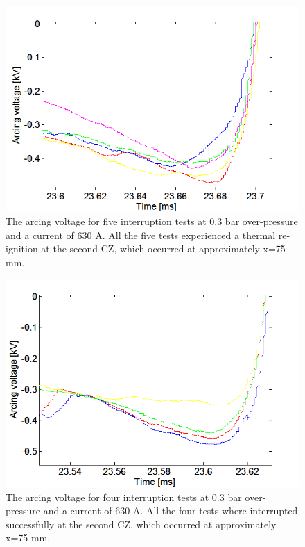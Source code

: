 \documentclass[10pt,b5paper,twoside]{article}
\begin{document}
\begin{figure}[H]
\centering
\includegraphics[scale=0.6, angle =0 ]{Bilder/Results/ArcingVoltage_75_reIgnition.PNG}
\caption{The arcing voltage for five interruption tests at 0.3 bar over-pressure and a current of 630 A. All the five tests experienced a thermal re-ignition at the second CZ, which occurred at approximately  x=75 mm.} \label{fig:75mmUnSuccessful}
\end{figure}

\begin{figure}[H]
\centering
\includegraphics[scale=0.6, angle =0 ]{Bilder/Results/ArcingVoltage_75_none_reIgnition.PNG}
\caption{The arcing voltage for four interruption tests at 0.3 bar over-pressure and a current of 630 A. All the four tests where interrupted successfully at the second CZ, which occurred at approximately  x=75 mm.} \label{fig:75mmSuccessful}
\end{figure}
\end{document}

